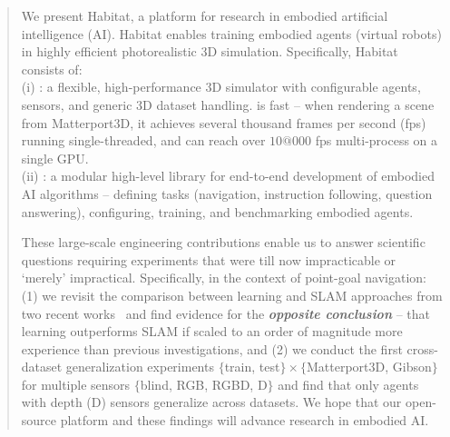 \begin{abstract}
We present Habitat, a platform for research in embodied artificial intelligence (AI).
Habitat enables training embodied agents (virtual robots) in highly efficient photorealistic 3D simulation.
Specifically, Habitat consists of: \\
(i) \habitatsim: a flexible, high-performance 3D simulator with configurable agents, sensors, and generic 3D dataset handling. \habitatsim is fast -- when rendering a scene from Matterport3D, it achieves several thousand frames per second (fps) running single-threaded, and can reach over $10@000$ fps multi-process on a single GPU. \\ 
(ii) \habitatapi: a modular high-level library for end-to-end development of embodied AI algorithms -- defining tasks (\eg navigation, instruction following, question answering), configuring, training, and benchmarking embodied agents.

These large-scale engineering contributions enable us to answer scientific questions requiring experiments that were till now impracticable or `merely' impractical.
Specifically, in the context of point-goal navigation:
(1) we revisit the comparison between learning and SLAM approaches from two recent works~\cite{mishkin2019benchmarking, kojima2019learn} and find evidence for the \textbf{\emph{opposite conclusion}} --
that learning outperforms SLAM if scaled to an order of magnitude 
more experience than previous investigations, and
(2) we conduct the first cross-dataset generalization experiments 
$\{$train, test$\} \times \{$Matterport3D, Gibson$\}$ for multiple sensors $\{$blind, RGB, RGBD, D$\}$ and find that only agents with depth (D) sensors generalize across datasets.
We hope that our open-source platform and these findings will advance research in embodied AI.

\end{abstract}